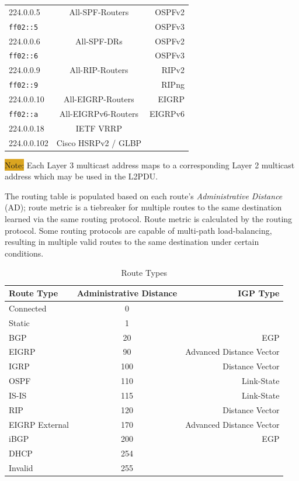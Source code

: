 \documentclass[12pt]{article}
\newcommand{\note}[1]{\colorbox{#1}{Note:}}
\begin{document}
\begin{table}[H]
\begin{minipage}{.6\linewidth}
\begin{tabular}{| l | c | r|}
	224.0.0.5		& All-SPF-Routers	& OSPFv2\\
	\texttt{ff02::5}	&				& OSPFv3\\\hline
	224.0.0.6		& All-SPF-DRs		& OSPFv2\\
	\texttt{ff02::6}	&				& OSPFv3\\\hline
	224.0.0.9		& All-RIP-Routers		& RIPv2\\
	\texttt{ff02::9}	&				& RIPng\\\hline
	224.0.0.10		& All-EIGRP-Routers	& EIGRP\\
	\texttt{ff02::a}	& All-EIGRPv6-Routers	& EIGRPv6\\\hline
	224.0.0.18		& IETF VRRP		&\\\hline
	224.0.0.102		& Cisco HSRPv2 / GLBP	&\\\hline
	\end{tabular}\end{minipage}\end{table}
	\note{Goldenrod} Each Layer 3 multicast address maps to a corresponding Layer 2 multicast address which may be used in the L2PDU.

	The routing table is populated based on each route's \textit{Administrative Distance} (AD); route metric is a tiebreaker for multiple routes to the same destination learned via the same routing protocol. Route metric is calculated by the routing protocol. Some routing protocols are capable of multi-path load-balancing, resulting in multiple valid routes to the same destination under certain conditions.

	\begin{table}[H]
	\centering
	\caption{Route Types \label{tab:ROUTE TYPES}}
	\begin{tabular}{lcr}
	\hline
	\textbf{Route Type}	& \textbf{Administrative Distance}	& \textbf{IGP Type}\\\hline
	Connected			& 0						&\\\hline
	Static				& 1						&\\\hline
	BGP				& 20						& EGP\\\hline
	EIGRP				& 90						& Advanced Distance Vector\\\hline
	IGRP				& 100						& Distance Vector\\\hline
	OSPF				& 110						& Link-State\\\hline
	IS-IS				& 115						& Link-State\\\hline
	RIP				& 120						& Distance Vector\\\hline
	EIGRP External		& 170						& Advanced Distance Vector\\\hline
	iBGP				& 200						& EGP\\\hline
	DHCP			& 254						&\\\hline
	Invalid			& 255						&\\\hline
	\end{tabular}\end{table}
\end{document}
